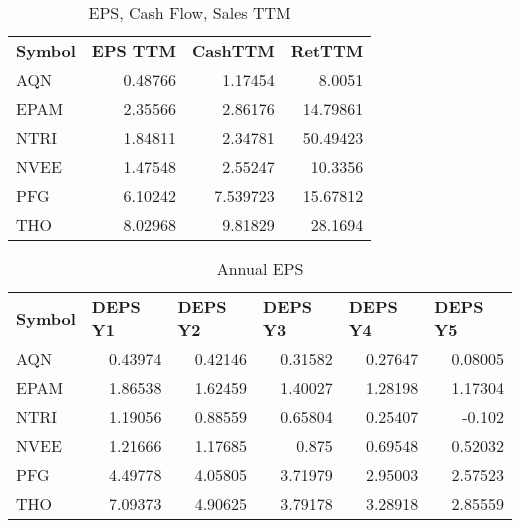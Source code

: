 \documentclass{article}
\begin{document}
\begin{table}[htbp]
  \caption{EPS, Cash Flow, Sales TTM}
   \begin{tabular}{lrrr}
   	\textbf{Symbol} & \multicolumn{1}{l}{\textbf{EPS TTM}} & \multicolumn{1}{l}{\textbf{CashTTM}} & \multicolumn{1}{l}{\textbf{RetTTM}} \\
   	AQN   & 0.48766 & 1.17454 & 8.0051 \\
   	EPAM  & 2.35566 & 2.86176 & 14.79861 \\
   	NTRI  & 1.84811 & 2.34781 & 50.49423 \\
   	NVEE  & 1.47548 & 2.55247 & 10.3356 \\
   	PFG   & 6.10242 & 7.539723 & 15.67812 \\
   	THO   & 8.02968 & 9.81829 & 28.1694 \\
   \end{tabular}%
   \label{tab:addlabel}%
\end{table}%

\begin{table}[htbp]
  \caption{Annual EPS}
    \begin{tabular}{lrrrrr}
    	\textbf{Symbol} & \multicolumn{1}{l}{\textbf{DEPS Y1}} & \multicolumn{1}{l}{\textbf{DEPS Y2}} & \multicolumn{1}{l}{\textbf{DEPS Y3}} & \multicolumn{1}{l}{\textbf{DEPS Y4}} & \multicolumn{1}{l}{\textbf{DEPS Y5}} \\
    	AQN   & 0.43974 & 0.42146 & 0.31582 & 0.27647 & 0.08005 \\
    	EPAM  & 1.86538 & 1.62459 & 1.40027 & 1.28198 & 1.17304 \\
    	NTRI  & 1.19056 & 0.88559 & 0.65804 & 0.25407 & -0.102 \\
    	NVEE  & 1.21666 & 1.17685 & 0.875 & 0.69548 & 0.52032 \\
    	PFG   & 4.49778 & 4.05805 & 3.71979 & 2.95003 & 2.57523 \\
    	THO   & 7.09373 & 4.90625 & 3.79178 & 3.28918 & 2.85559 \\
    \end{tabular}%
    \label{tab:addlabel}%
\end{table}%
\end{document}
